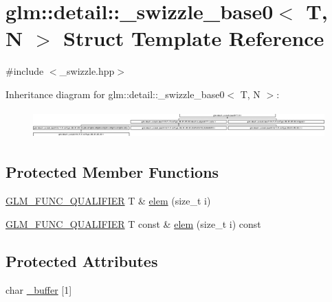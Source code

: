 \hypertarget{structglm_1_1detail_1_1__swizzle__base0}{}\section{glm\+::detail\+::\+\_\+swizzle\+\_\+base0$<$ T, N $>$ Struct Template Reference}
\label{structglm_1_1detail_1_1__swizzle__base0}


{\ttfamily \#include $<$\+\_\+swizzle.\+hpp$>$}

Inheritance diagram for glm\+::detail\+::\+\_\+swizzle\+\_\+base0$<$ T, N $>$\+:\begin{figure}[H]
\begin{center}
\leavevmode
\includegraphics[height=1.082126cm]{structglm_1_1detail_1_1__swizzle__base0}
\end{center}
\end{figure}
\subsection*{Protected Member Functions}
\begin{DoxyCompactItemize}
\item 
\mbox{\hyperlink{setup_8hpp_a33fdea6f91c5f834105f7415e2a64407}{G\+L\+M\+\_\+\+F\+U\+N\+C\+\_\+\+Q\+U\+A\+L\+I\+F\+I\+ER}} T \& \mbox{\hyperlink{structglm_1_1detail_1_1__swizzle__base0_a4011ff1a445ccda72c385462106eb3ff}{elem}} (size\+\_\+t i)
\item 
\mbox{\hyperlink{setup_8hpp_a33fdea6f91c5f834105f7415e2a64407}{G\+L\+M\+\_\+\+F\+U\+N\+C\+\_\+\+Q\+U\+A\+L\+I\+F\+I\+ER}} T const  \& \mbox{\hyperlink{structglm_1_1detail_1_1__swizzle__base0_a495081f60b8fc565a5a35bfdd8b13c84}{elem}} (size\+\_\+t i) const
\end{DoxyCompactItemize}
\subsection*{Protected Attributes}
\begin{DoxyCompactItemize}
\item 
char \mbox{\hyperlink{structglm_1_1detail_1_1__swizzle__base0_afd4b7f15c9acff4cdef808f559ffec2d}{\+\_\+buffer}} \mbox{[}1\mbox{]}
\end{DoxyCompactItemize}


